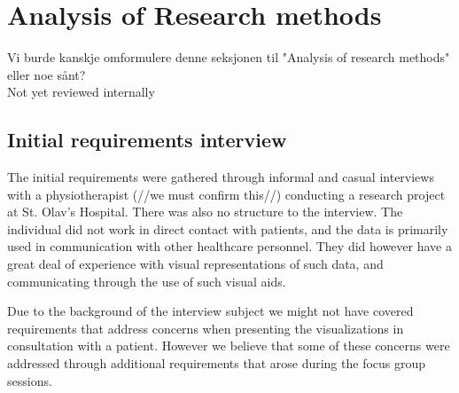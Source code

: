 \chapter{Analysis of Research methods}
Vi burde kanskje omformulere denne seksjonen til "Analysis of research methods" eller noe sånt?
\\Not yet reviewed internally

\section{Initial requirements interview}
The initial requirements were gathered through informal and casual interviews with a physiotherapist (//we must confirm this//) conducting a research project at St. Olav's Hospital. There was also no structure to the interview. The individual did not work in direct contact with patients, and the data is primarily used in communication with other healthcare personnel. 
They did however have a great deal of experience with visual representations of such data, and communicating through the use of such visual aids.

Due to the background of the interview subject we might not have covered requirements that address concerns when presenting the visualizations in consultation with a patient. 
However we believe that some of these concerns were addressed through additional requirements that arose during the focus group sessions.

